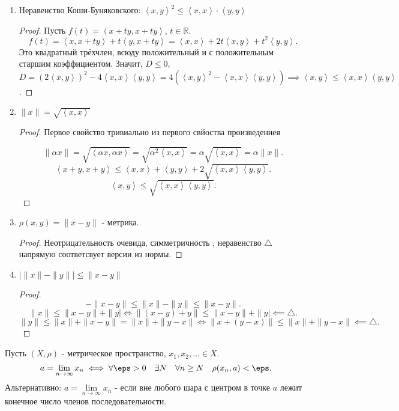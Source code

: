 \begin{properties} \thmslashn

    \begin{enumerate}
        \item Неравенство Коши-Буняковского: $\left<x, y\right>^2 \le \left<x, x\right> \cdot \left<y, y\right>$
            \begin{proof} \thmslashn

                Пусть $f(t) = \left<x+ty, x+ty\right>$, $t\in \mathbb{R}$.
                \[ f(t) = \left<x, x+ty\right> + t\left<y, x+ty\right> = \left<x, x\right> + 2t\left<x, y\right> + t^2\left<y, y\right> .\]
                Это квадратный трёхчлен, всюду положительный и с положительным старшим коэффициентом. Значит, $D \le 0$, $D = (2\left<x, y\right>)^2 - 4\left<x, x\right>\left<y, y\right> = 4(\left<x,y\right>^2 - \left<x, x\right>\left<y, y\right>) \implies \left<x, y\right> \le \left<x, x\right>\left<y, y\right>$.
            \end{proof}
        \item $\|x\| = \sqrt{\left<x, x\right>} $ 
            \begin{proof} \thmslashn

                Первое свойство тривиально из первого свйоства произведениея

                \[ \| \alpha x\| = \sqrt{\left<\alpha x, \alpha x\right>} = \sqrt{\alpha^2 \left<x, x\right>} = \alpha \sqrt{\left<x, x\right>} = \alpha \|x\|   .\]
                \[ \left<x+y, x+y\right> \le \left<x, x\right> + \left<y, y\right> + 2\sqrt{\left<x, x\right>\left<y, y\right>}  .\]
                \[ \left<x, y\right> \le \sqrt{\left<x, x\right>\left<y, y\right>}  .\]
            \end{proof}
        \item $\rho(x,y) = \|x-y\|$ - метрика.
            \begin{proof}
                Неотрицательность очевида, симметричность \TODO, неравенство $\triangle$ напрямую соответсвует версии из нормы.
            \end{proof}
        \item $|\|x\| - \|y\| | \le \|x-y\|$
            \begin{proof}
                \[ -\|x-y\| \le \|x\| - \|y\| \le \|x-y\| .\]
                \[ \|x\| \le \|x-y\| + \|y| \iff \|(x-y)+y\| \le \|x-y\| + \|y| \impliedby \triangle .\]
                \[ \|y\| \le \|x\| + \|x-y\| = \|x\| + \|y-x\| \iff \|x+(y-x)\| \le \|x\| + \|y-x\| \impliedby \triangle .\] 
            \end{proof}
    \end{enumerate}
\end{properties}
\begin{definition} \thmslashn 

    Пусть $(X, \rho)$ - метрическое пространство, $x_1, x_2, \ldots\in X$.
    \[ a = \lim_{n \to \infty} x_{n} \iff \forall{\eps > 0}\quad \exists{N}\quad \forall{n \ge N}\quad \rho(x_{n}, a) < \eps .\]
    Альтернативно: $a = \lim\limits_{n \to \infty} x_{n}$ - если вне любого шара с центром в точке $a$ лежит конечное число членов последовательности.
\end{definition}
